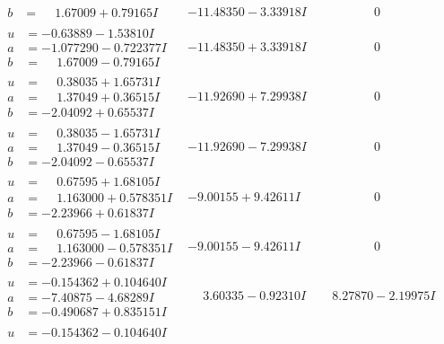 \documentclass[1p]{elsarticle_modified}
\theoremstyle{definition}
\begin{document}
$$\begin{array}{c|c|c}
\begin{aligned}
b &= \phantom{-}1.67009 + 0.79165 I\end{aligned}
 & -11.48350 - 3.33918 I & \phantom{-0.000000 } 0 \\ \hline\begin{aligned}
u &= -0.63889 - 1.53810 I \\
a &= -1.077290 - 0.722377 I \\
b &= \phantom{-}1.67009 - 0.79165 I\end{aligned}
 & -11.48350 + 3.33918 I & \phantom{-0.000000 } 0 \\ \hline\begin{aligned}
u &= \phantom{-}0.38035 + 1.65731 I \\
a &= \phantom{-}1.37049 + 0.36515 I \\
b &= -2.04092 + 0.65537 I\end{aligned}
 & -11.92690 + 7.29938 I & \phantom{-0.000000 } 0 \\ \hline\begin{aligned}
u &= \phantom{-}0.38035 - 1.65731 I \\
a &= \phantom{-}1.37049 - 0.36515 I \\
b &= -2.04092 - 0.65537 I\end{aligned}
 & -11.92690 - 7.29938 I & \phantom{-0.000000 } 0 \\ \hline\begin{aligned}
u &= \phantom{-}0.67595 + 1.68105 I \\
a &= \phantom{-}1.163000 + 0.578351 I \\
b &= -2.23966 + 0.61837 I\end{aligned}
 & -9.00155 + 9.42611 I & \phantom{-0.000000 } 0 \\ \hline\begin{aligned}
u &= \phantom{-}0.67595 - 1.68105 I \\
a &= \phantom{-}1.163000 - 0.578351 I \\
b &= -2.23966 - 0.61837 I\end{aligned}
 & -9.00155 - 9.42611 I & \phantom{-0.000000 } 0 \\ \hline\begin{aligned}
u &= -0.154362 + 0.104640 I \\
a &= -7.40875 - 4.68289 I \\
b &= -0.490687 + 0.835151 I\end{aligned}
 & \phantom{-}3.60335 - 0.92310 I & \phantom{-}8.27870 - 2.19975 I \\ \hline\begin{aligned}
u &= -0.154362 - 0.104640 I \\

\end{aligned}
\end{array}$$
\end{document}
